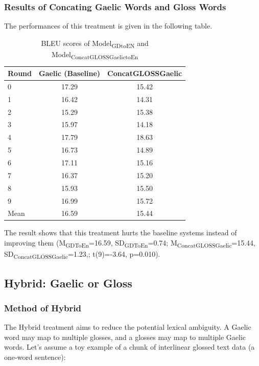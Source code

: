 \documentclass[final]{ua-thesis}
\numberwithin{equation}{section}
\begin{document}
\subsubsection{Results of Concating Gaelic Words and Gloss Words}
The performances of this treatment is given in the following table.
\begin{table}[ht]
\centering
\begin{tabular}{lcc}
  \hline
Round & Gaelic (Baseline) & ConcatGLOSSGaelic \\ 
  \hline
0 & 17.29 & 15.42 \\ 
  1 & 16.42 & 14.31 \\ 
  2 & 15.29 & 15.38 \\ 
  3 & 15.97 & 14.18 \\ 
  4 & 17.79 & 18.63 \\ 
  5 & 16.73 & 14.89 \\ 
  6 & 17.11 & 15.16 \\ 
  7 & 16.37 & 15.20 \\ 
  8 & 15.93 & 15.50 \\ 
  9 & 16.99 & 15.72 \\ 
   \hline
Mean & 16.59 & 15.44 \\ 
   \hline
\end{tabular}
\caption{BLEU scores of Model\textsubscript{GDtoEN} and Model\textsubscript{ConcatGLOSSGaelictoEn} } 
\label{Table:Concating}
\end{table}\newline
The result shows that this treatment hurts the baseline systems instead of improving them (M\textsubscript{GDToEn}=16.59, SD\textsubscript{GDToEn}=0.74; M\textsubscript{ConcatGLOSSGaelic}=15.44, SD\textsubscript{ConcatGLOSSGaelic}=1.23,; t(9)=-3.64, p=0.010).

\subsection{Hybrid: Gaelic or Gloss}
\subsubsection{Method of Hybrid}
The Hybrid treatment aims to reduce the potential lexical ambiguity. A Gaelic word may map to multiple glosses, and a glosses may map to multiple Gaelic words. Let's assume a toy example of a chunk of interlinear glossed text data (a one-word sentence): 
\end{document}
